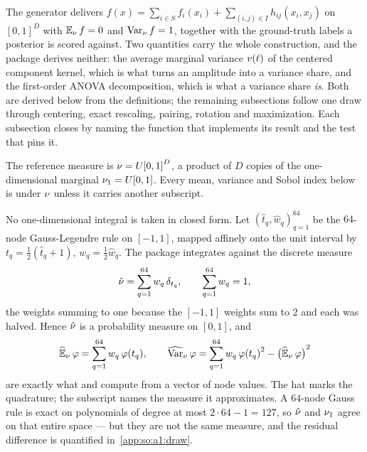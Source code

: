 
\label{app:so:a1}

The generator delivers $f(x)=\sum_{i\in S}f_i(x_i)+\sum_{(i,j)\in
I}h_{ij}(x_i,x_j)$ on ${[0,1]}^D$ with $\operatorname{\mathbb{E}}_\nu f=0$ and $\operatorname{\mathrm{Var}}_\nu f=1$, together
with the ground-truth labels a posterior is scored against. Two quantities
carry the whole construction, and the package derives neither: the average
marginal variance $v(\ell)$ of the centered component kernel, which is
what turns an amplitude into a variance share, and the first-order ANOVA
decomposition, which is what a variance share \emph{is}. Both are derived
below from the definitions; the remaining subsections follow one draw through
centering, exact rescaling, pairing, rotation and maximization. Each
subsection closes by naming the function that implements its result and the
test that pins it.

\label{app:so:a1:measure}

The reference measure is $\nu=U{[0,1]}^D$, a product of $D$ copies of the
one-dimensional marginal $\nu_1=U[0,1]$. Every mean, variance and Sobol
index below is under $\nu$ unless it carries another subscript.

No one-dimensional integral is taken in closed form. Let
${(\hat t_q,\hat w_q)}_{q=1}^{64}$
be the $64$-node Gauss-Legendre rule on $[-1,1]$, mapped
affinely onto the unit interval by $t_q=\tfrac12(\hat t_q+1)$,
$w_q=\tfrac12\hat w_q$. The package integrates against the discrete measure
\begin{equation}\label{app:so:a1:eq:nuhat}
  \hat\nu=\sum_{q=1}^{64}w_q\,\delta_{t_q},
  \qquad
  \sum_{q=1}^{64}w_q=1,
\end{equation}
the weights summing to one because the $[-1,1]$ weights sum to $2$ and each
was halved. Hence $\hat\nu$ is a probability measure on $[0,1]$, and
\begin{equation}\label{app:so:a1:eq:quad}
  \operatorname{\widehat{\mathbb{E}}}_\nu\varphi=\sum_{q=1}^{64}w_q\,\varphi(t_q),
  \qquad
  \operatorname{\widehat{\mathrm{Var}}}_\nu\varphi=\sum_{q=1}^{64}w_q\,{\varphi(t_q)}^2-{\bigl(\operatorname{\widehat{\mathbb{E}}}_\nu\varphi\bigr)}^2
\end{equation}
are exactly what  and  compute
from a vector of node values. The hat marks the quadrature; the subscript
names the measure it approximates. A $64$-node Gauss rule is exact on
polynomials of degree at most $2\cdot 64-1=127$, so $\hat\nu$ and $\nu_1$
agree on that entire space --- but they are not the same measure, and the
residual difference is quantified in~\ref{app:so:a1:draw}.

